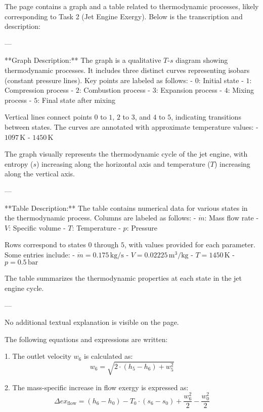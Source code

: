 The page contains a graph and a table related to thermodynamic processes, likely corresponding to Task 2 (Jet Engine Exergy). Below is the transcription and description:

---

**Graph Description:**  
The graph is a qualitative \( T \)-\( s \) diagram showing thermodynamic processes. It includes three distinct curves representing isobars (constant pressure lines). Key points are labeled as follows:  
- \( 0 \): Initial state  
- \( 1 \): Compression process  
- \( 2 \): Combustion process  
- \( 3 \): Expansion process  
- \( 4 \): Mixing process  
- \( 5 \): Final state after mixing  

Vertical lines connect points \( 0 \) to \( 1 \), \( 2 \) to \( 3 \), and \( 4 \) to \( 5 \), indicating transitions between states. The curves are annotated with approximate temperature values:  
- \( 1097 \, \text{K} \)  
- \( 1450 \, \text{K} \)  

The graph visually represents the thermodynamic cycle of the jet engine, with entropy (\( s \)) increasing along the horizontal axis and temperature (\( T \)) increasing along the vertical axis.

---

**Table Description:**  
The table contains numerical data for various states in the thermodynamic process. Columns are labeled as follows:  
- \( \dot{m} \): Mass flow rate  
- \( V \): Specific volume  
- \( T \): Temperature  
- \( p \): Pressure  

Rows correspond to states \( 0 \) through \( 5 \), with values provided for each parameter. Some entries include:  
- \( \dot{m} = 0.175 \, \text{kg/s} \)  
- \( V = 0.02225 \, \text{m}^3/\text{kg} \)  
- \( T = 1450 \, \text{K} \)  
- \( p = 0.5 \, \text{bar} \)  

The table summarizes the thermodynamic properties at each state in the jet engine cycle.

---

No additional textual explanation is visible on the page.

The following equations and expressions are written:  

1. The outlet velocity \( w_6 \) is calculated as:  
\[
w_6 = \sqrt{2 \cdot \left( h_5 - h_6 \right) + w_5^2}
\]  

2. The mass-specific increase in flow exergy is expressed as:  
\[
\Delta ex_{\text{flow}} = \left( h_6 - h_0 \right) - T_0 \cdot \left( s_6 - s_0 \right) + \frac{w_6^2}{2} - \frac{w_0^2}{2}
\]  

